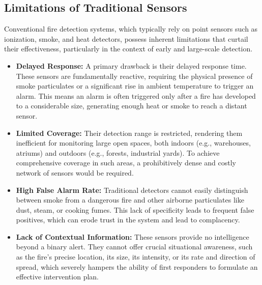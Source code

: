 \documentclass[12pt,a4paper]{article}
\begin{document}
\subsection{Limitations of Traditional Sensors}
Conventional fire detection systems, which typically rely on point sensors such as ionization, smoke, and heat detectors, possess inherent limitations that curtail their effectiveness, particularly in the context of early and large-scale detection.
\begin{itemize}
  \item \textbf{Delayed Response:} A primary drawback is their delayed response time. These sensors are fundamentally reactive, requiring the physical presence of smoke particulates or a significant rise in ambient temperature to trigger an alarm. This means an alarm is often triggered only after a fire has developed to a considerable size, generating enough heat or smoke to reach a distant sensor.
  \item \textbf{Limited Coverage:} Their detection range is restricted, rendering them inefficient for monitoring large open spaces, both indoors (e.g., warehouses, atriums) and outdoors (e.g., forests, industrial yards). To achieve comprehensive coverage in such areas, a prohibitively dense and costly network of sensors would be required.
  \item \textbf{High False Alarm Rate:} Traditional detectors cannot easily distinguish between smoke from a dangerous fire and other airborne particulates like dust, steam, or cooking fumes. This lack of specificity leads to frequent false positives, which can erode trust in the system and lead to complacency.
  \item \textbf{Lack of Contextual Information:} These sensors provide no intelligence beyond a binary alert. They cannot offer crucial situational awareness, such as the fire's precise location, its size, its intensity, or its rate and direction of spread, which severely hampers the ability of first responders to formulate an effective intervention plan.
\end{itemize}
\end{document}
